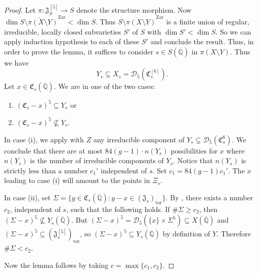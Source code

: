 \documentclass[12pt,oneside]{amsart}
\numberwithin{maincounter}{section}
\numberwithin{equation}{section}
\def\QQ{\mathbb{Q}}
\newcommand{\IQbar}{{\overline{\QQ}}}
\begin{document}
\begin{proof}
Let $\pi \colon \mathfrak{J}_S^{[5]} \rightarrow S$ denote the
structure morphism.
Now $\dim \overline{S \setminus
  \pi(X\setminus Y)}^{\mathrm{Zar}}< \dim S$.
Thus $\overline{S \setminus
  \pi(X\setminus Y)}^{\mathrm{Zar}}$ is a finite union of regular,
irreducible, locally closed subvarieties $S'$ of $S$ with $\dim
S'<\dim S$. 
So we can apply induction hypothesis to each of these $S'$ and
conclude the result. Thus, in order to prove the
lemma, it suffices to consider $s\in S(\IQbar)$  in
$\pi(X\setminus Y)$. Thus we have %
\begin{equation*}
Y_s \subsetneq X_s = \mathscr{D}_5(\mathfrak{C}_s^{[6]}). %
\end{equation*}
Let $x \in \mathfrak{C}_s(\IQbar)$.
We are in one of the two cases:
\begin{enumerate}
\item[(i)] $(\mathfrak{C}_s-x)^5 \subseteq Y_s$ or %
\item[(ii)] $(\mathfrak{C}_s-x)^5 \not\subseteq Y_s$.
\end{enumerate}

In case (i), we apply \cite[Lemma 6.4]{DGHUnifML} with
$Z$ any irreducible component of $Y_s\subsetneq
\mathscr{D}_5(\mathfrak{C}_s^6)$. We conclude that
there are at most $84(g-1)\cdot n(Y_s)$ possibilities
for $x$ where $n(Y_s)$ is the number of irreducible
components of $Y_s$. Notice that
$n(Y_s)$ is strictly less than a number $c_1'$ independent of $s$. Set $c_1 = 84(g-1)c_1'$.
The $x$ leading to case (i) will amount to the points in $\Xi_s$. %

In case (ii), set $\Sigma = \{y \in \mathfrak{C}_s(\IQbar) : y-x \in
(\mathfrak{J}_s)_{\mathrm{tor}} \}$. By \cite[Lemma 6.3]{DGHUnifML},
there exists a number $c_2$, independent of $s$, such that the
following holds. If $\# \Sigma  \ge c_2$, then $(\Sigma-x)^5 \not\subseteq Y_s(\IQbar)$. But $(\Sigma-x)^5 = \mathscr{D}_5(\{x\} \times \Sigma^5) \subseteq X(\IQbar)$ and $(\Sigma-x)^5 \subseteq (\mathfrak{J}_s^{[5]})_{\mathrm{tor}}$, so $(\Sigma-x)^5 \subseteq Y_s(\IQbar)$ by definition of $Y$. Therefore $\#\Sigma < c_2$.

Now the lemma follows by taking $c = \max\{c_1,c_2\}$.
\end{proof}
\end{document}
